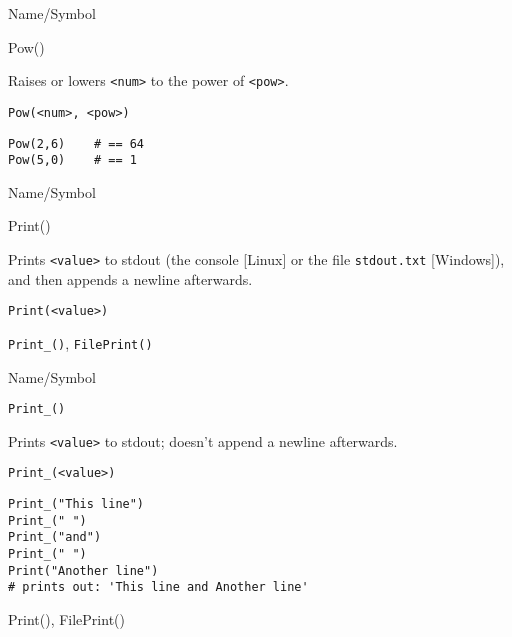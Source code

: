 \rl


\begin{desc}{Name/Symbol}
\item[Name/Symbol]	Pow() 

\item[Description]	Raises or lowers \verb+<num>+ to the power of \verb+<pow>+.

\item[Usage]		
\begin{verbatim}
Pow(<num>, <pow>)
\end{verbatim}

\item[Example]	
\begin{verbatim}
Pow(2,6)	# == 64
Pow(5,0)	# == 1
\end{verbatim}

\item[See Also]     
\end{desc}

\rl


\begin{desc}{Name/Symbol}
\item[Name/Symbol]	Print()

\item[Description]	Prints \verb+<value>+ to stdout (the console [Linux] or the file \texttt{stdout.txt} [Windows]), and then appends a newline afterwards.

\item[Usage]		
\begin{verbatim}
Print(<value>)
\end{verbatim}

\item[Example]	

\item[See Also]	\verb+Print_()+, \verb+FilePrint()+
\end{desc}

\rl


\begin{desc}{Name/Symbol}
\item[Name/Symbol]	\verb+Print_()+

\item[Description]	Prints \verb+<value>+ to stdout; doesn't append a newline afterwards.

\item[Usage]		
\begin{verbatim}
Print_(<value>)
\end{verbatim}

\item[Example]	
\begin{verbatim}
Print_("This line")
Print_(" ")
Print_("and")
Print_(" ")
Print("Another line")
# prints out: 'This line and Another line'
\end{verbatim}

\item[See Also]	Print(), FilePrint()
\end{desc}

